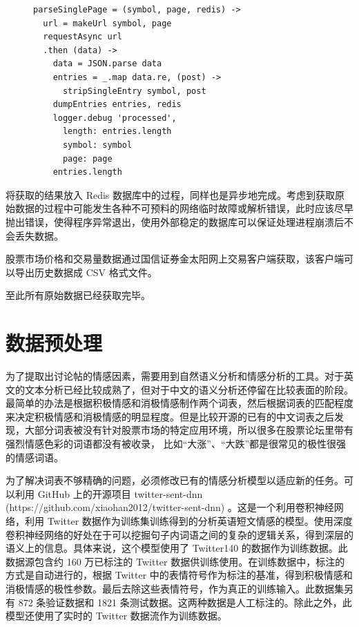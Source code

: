 \begin{figure}
  \begin{minipage}{\textwidth}
    \begin{lstlisting}[caption=请求服务器数据, label=data:1]
parseSinglePage = (symbol, page, redis) ->
  url = makeUrl symbol, page
  requestAsync url
  .then (data) ->
    data = JSON.parse data
    entries = _.map data.re, (post) ->
      stripSingleEntry symbol, post
    dumpEntries entries, redis
    logger.debug 'processed',
      length: entries.length
      symbol: symbol
      page: page
    entries.length
    \end{lstlisting}
  \end{minipage}
\end{figure}

将获取的结果放入 Redis 数据库中的过程，同样也是异步地完成。考虑到获取原始数据的过程中可能发生各种不可预料的网络临时故障或解析错误，此时应该尽早抛出错误，使得程序异常退出，使用外部稳定的数据库可以保证处理进程崩溃后不会丢失数据。

股票市场价格和交易量数据通过国信证券金太阳网上交易客户端获取，该客户端可以导出历史数据成 CSV 格式文件。

至此所有原始数据已经获取完毕。

\section{数据预处理}

为了提取出讨论帖的情感因素，需要用到自然语义分析和情感分析的工具。对于英文的文本分析已经比较成熟了，但对于中文的语义分析还停留在比较表面的阶段。最简单的办法是根据积极情感和消极情感制作两个词表，然后根据词表的匹配程度来决定积极情感和消极情感的明显程度。但是比较开源的已有的中文词表之后发现，大部分词表被没有针对股票市场的特定应用环境，所以很多在股票论坛里带有强烈情感色彩的词语都没有被收录， 比如``大涨''、``大跌''都是很常见的极性很强的情感词语。

为了解决词表不够精确的问题，必须修改已有的情感分析模型以适应新的任务。可以利用 GitHub 上的开源项目 twitter-sent-dnn (https://github.com/xiaohan2012/twitter-sent-dnn) 。这是一个利用卷积神经网络，利用 Twitter 数据作为训练集训练得到的分析英语短文情感的模型。使用深度卷积神经网络的好处在于可以挖掘句子内词语之间的复杂的逻辑关系，得到深层的语义上的信息。具体来说，这个模型使用了 Twitter140 的数据作为训练数据。此数据源包含约 160 万已标注的 Twitter 数据供训练使用。在训练数据中，标注的方式是自动进行的，根据 Twitter 中的表情符号作为标注的基准，得到积极情感和消极情感的极性参数。最后去除这些表情符号，作为真正的训练输入。此数据集另有 872 条验证数据和 1821 条测试数据。这两种数据是人工标注的。除此之外，此模型还使用了实时的 Twitter 数据流作为训练数据。

